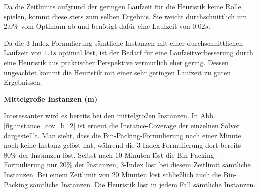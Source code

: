 \begin{figure}[H]
\caption{}
\label{fig:table}
\end{figure}

Da die Zeitlimits aufgrund der geringen Laufzeit für die Heuristik keine Rolle spielen, kommt diese stets zum selben Ergebnis.
Sie weicht durchschnittlich um $2.0 \%$ vom Optimum ab und benötigt dafür eine Laufzeit von $0.02s$.

Da die 3-Index-Formulierung sämtliche Instanzen mit einer durchschnittlichen Laufzeit von $1.1s$ optimal löst, ist der Bedarf für
eine Laufzeitverbesserung durch eine Heuristik aus praktischer Perspektive vermutlich eher gering. Dessen ungeachtet kommt die
Heuristik mit einer sehr geringen Laufzeit zu guten Ergebnissen.

\textbf{Mittelgroße Instanzen (m)}

Interessanter wird es bereits bei den mittelgroßen Instanzen. In Abb. \ref{fig:instance_cov_b=2} ist erneut die Instance-Coverage
der einzelnen Solver dargestelllt. Man sieht, dass die Bin-Packing-Formulierung nach einer Minute noch keine Instanz gelöst hat, während die
3-Index-Formulierung dort bereits $80 \%$ der Instanzen löst. Selbst nach $10$ Minuten löst die Bin-Packing-Formulierung nur
$20 \%$ der Instanzen, 3-Index löst bei diesem Zeitlimit sämtliche Instanzen. Bei einem Zeitlimit von $20$ Minuten löst schließlich auch
die Bin-Packing sämtliche Instanzen. Die Heuristik löst in jedem Fall sämtliche Instanzen.
